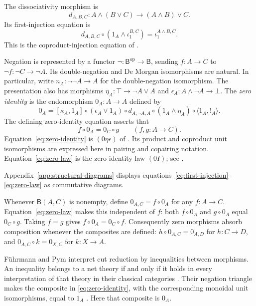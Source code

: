 \documentclass[11pt]{article}
\newcommand{\B}{\mathsf B}
\begin{document}
The dissociativity morphism is
\[
 d_{A,B,C}:A\wedge(B\vee C)\longrightarrow(A\wedge B)\vee C.
\]
Its first-injection equation is
\begin{equation}
 d_{A,B,C}\circ(1_A\wedge\iota_1^{B,C})
   =\iota_1^{A\wedge B,C}.
 \label{eq:first-injection}
\end{equation}
This is the coproduct-injection equation of
\cite[\S11.1, p.~234]{DP}.

Negation is represented by a functor
$\neg:\B^{\mathrm{op}}\to\B$, sending $f:A\to C$ to
$\neg f:\neg C\to\neg A$. Its double-negation and De Morgan
isomorphisms are natural. In particular, write
$n_A:\neg\neg A\to A$ for the double-negation isomorphism.
The presentation also has morphisms
$\eta_A:\top\to\neg A\vee A$ and
$\epsilon_A:A\wedge\neg A\to\bot$.
The \emph{zero identity} is the endomorphism $0_A:A\to A$ defined by
\begin{equation}
 0_A=[\kappa_A,1_A]\circ(\epsilon_A\vee1_A)\circ d_{A,\neg A,A}
     \circ(1_A\wedge\eta_A)\circ\langle1_A,!_A\rangle.
 \label{eq:zero-identity}
\end{equation}
The defining zero-identity equation asserts that
\begin{equation}
 f\circ0_A=0_C\circ g
 \qquad(f,g:A\to C).
 \label{eq:zero-law}
\end{equation}
Equation~\eqref{eq:zero-identity} is $(0\eta\epsilon)$ of
\cite[\S14.2, p.~317]{DP}. Its product and coproduct unit isomorphisms
are expressed here in pairing and copairing notation.
Equation~\eqref{eq:zero-law} is the zero-identity law $(0I)$;
see \cite[\S14.3, p.~322]{DP}.

Appendix~\ref{app:structural-diagrams} displays
equations~\eqref{eq:first-injection}--\eqref{eq:zero-law}
as commutative diagrams.

Whenever $\B(A,C)$ is nonempty, define $0_{A,C}=f\circ0_A$ for any
$f:A\to C$. Equation~\eqref{eq:zero-law} makes this independent of
$f$: both $f\circ0_A$ and $g\circ0_A$ equal $0_C\circ g$.
Taking $f=g$ gives $f\circ0_A=0_C\circ f$. Consequently zero morphisms
absorb composition whenever the composites are defined:
$h\circ0_{A,C}=0_{A,D}$ for $h:C\to D$, and
$0_{A,C}\circ k=0_{X,C}$ for $k:X\to A$.

F\"uhrmann and Pym interpret cut reduction by inequalities between
morphisms. An inequality belongs to a net theory if and only if it
holds in every interpretation of that theory in their classical
categories \cite[Theorems~6.4--6.5]{FP}.
Their negation triangle makes the composite in
\eqref{eq:zero-identity}, with the corresponding monoidal unit
isomorphisms, equal to $1_A$ \cite[(11)]{FP}.
Here that composite is $0_A$.
\end{document}
